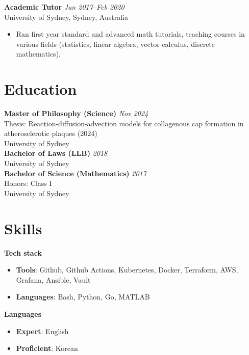 \documentclass[11pt,letterpaper]{article}
\newcommand{\header}[1]{\textbf{\color{headercolor}#1}}
\begin{document}
\vspace{0.4em}
\header{Academic Tutor} \hfill \hfill \textit {Jan 2017--Feb 2020}\\
University of Sydney, Sydney, Australia
\begin{itemize}[leftmargin=2em,itemsep=0.3ex]
  \item Ran first year standard and advanced math tutorials, teaching courses in various fields (statistics,
  linear algebra, vector calculus, discrete mathematics).
\end{itemize}

\vspace{0.3em}
\section*{Education}
\header{Master of Philosophy (Science)} \hfill \textit {Nov 2024}\\
Thesis: Reaction-diffusion-advection models for collagenous cap formation in atherosclerotic plaques (2024)\\
University of Sydney\\
\newline
\header{Bachelor of Laws (LLB)} \hfill \hfill \textit {2018}\\
University of Sydney \\
\newline
\header{Bachelor of Science (Mathematics)} \hfill \textit {2017}\\
Honors: Class I\\
University of Sydney
\vspace{0.3em}
\section*{Skills}
\header{Tech stack}
\begin{itemize}[leftmargin=2em,itemsep=0.3ex]
  \item \textbf{Tools}: Github, Github Actions, Kubernetes, Docker, Terraform, AWS, Grafana, Ansible, Vault
  \item \textbf{Languages}: Bash, Python, Go, MATLAB
\end{itemize}
\header{Languages}
\begin{itemize}[leftmargin=2em,itemsep=0.3ex]
	\item \textbf{Expert}: English
	\item \textbf{Proficient}: Korean
\end{itemize}
\end{document}
